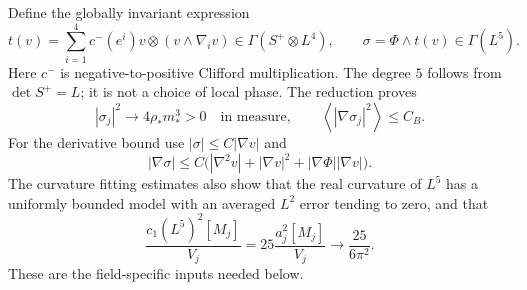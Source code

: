 \documentclass[11pt,a4paper]{article}
\theoremstyle{definition}
\theoremstyle{remark}
\newcommand{\av}[1]{\left\langle#1\right\rangle}
\begin{document}
Define the globally invariant expression
\begin{equation}
 t(v)=\sum_{i=1}^4c^-(e^i)v\otimes(v\wedge\nabla_i v)
 \in\Gamma(S^+\otimes L^4),\qquad
 \sigma=\Phi\wedge t(v)\in\Gamma(L^5).
 \label{eq:fifthline}
\end{equation}
Here $c^-$ is negative-to-positive Clifford multiplication. The degree $5$ follows from $\det S^+=L$; it is not a choice of local phase. The reduction proves
\begin{equation}
 |\sigma_j|^2\to4\rho_*m_*^3>0\quad\text{in measure},\qquad
 \av{|\nabla\sigma_j|^2}\le C_B.
 \label{eq:sigmalimits}
\end{equation}
For the derivative bound use $|\sigma|\le C|\nabla v|$ and
\[
 |\nabla\sigma|\le C\bigl(|\nabla^2v|+|\nabla v|^2+|\nabla\Phi||\nabla v|\bigr).
\]
The curvature fitting estimates also show that the real curvature of $L^5$ has a uniformly bounded model with an averaged $L^2$ error tending to zero, and that
\begin{equation}
 \frac{c_1(L^5)^2[M_j]}{V_j}
 =25\frac{a_j^2[M_j]}{V_j}\longrightarrow\frac{25}{6\pi^2}.
 \label{eq:positivechern}
\end{equation}
These are the field-specific inputs needed below.
\end{document}
